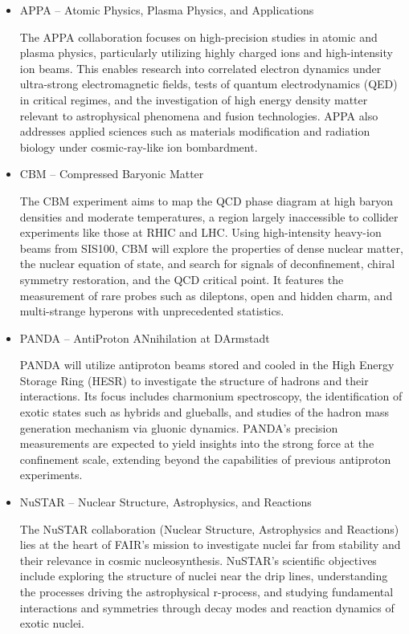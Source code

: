 \begin{itemize}
	\item APPA – Atomic Physics, Plasma Physics, and Applications \cite{APPA_2015}
	
	The APPA collaboration focuses on high-precision studies in atomic and plasma physics, particularly utilizing highly charged ions and high-intensity ion beams. This enables research into correlated electron dynamics under ultra-strong electromagnetic fields, tests of quantum electrodynamics (QED) in critical regimes, and the investigation of high energy density matter relevant to astrophysical phenomena and fusion technologies. APPA also addresses applied sciences such as materials modification and radiation biology under cosmic-ray-like ion bombardment.
	
	\item CBM – Compressed Baryonic Matter \cite{CBM_2023}
	
	The CBM experiment aims to map the QCD phase diagram at high baryon densities and moderate temperatures, a region largely inaccessible to collider experiments like those at RHIC and LHC. Using high-intensity heavy-ion beams from SIS100, CBM will explore the properties of dense nuclear matter, the nuclear equation of state, and search for signals of deconfinement, chiral symmetry restoration, and the QCD critical point. It features the measurement of rare probes such as dileptons, open and hidden charm, and multi-strange hyperons with unprecedented statistics.
	
	\item PANDA – AntiProton ANnihilation at DArmstadt \cite{PANDA_2013}
	
	PANDA will utilize antiproton beams stored and cooled in the High Energy Storage Ring (HESR) to investigate the structure of hadrons and their interactions. Its focus includes charmonium spectroscopy, the identification of exotic states such as hybrids and glueballs, and studies of the hadron mass generation mechanism via gluonic dynamics. PANDA's precision measurements are expected to yield insights into the strong force at the confinement scale, extending beyond the capabilities of previous antiproton experiments.
	
	\item NuSTAR – Nuclear Structure, Astrophysics, and Reactions \cite{NUSTAR_2015}
	
	The NuSTAR collaboration (Nuclear Structure, Astrophysics and Reactions) lies at the heart of \gls{FAIR}’s mission to investigate nuclei far from stability and their relevance in cosmic nucleosynthesis. NuSTAR's scientific objectives include exploring the structure of nuclei near the drip lines, understanding the processes driving the astrophysical r-process, and studying fundamental interactions and symmetries through decay modes and reaction dynamics of exotic nuclei.
	

\end{itemize}
